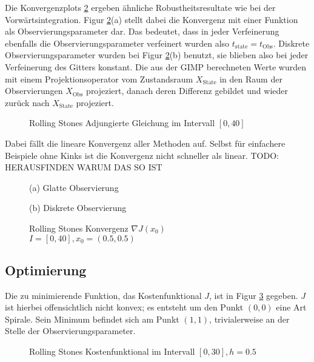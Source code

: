 Die Konvergenzplots \ref{fig:rollingStonesAdjoint} ergeben ähnliche Robustheitsresultate wie bei der Vorwärtsintegration. Figur \ref{fig:rollingStonesAdjoint}(a) stellt dabei die Konvergenz mit einer Funktion als Observierungsparameter dar. Das bedeutet, dass in jeder Verfeinerung ebenfalls die Observierungsparameter verfeinert wurden also $t_{\text{state}} = t_{\text{Obs}}$. Diskrete Observierungsparameter wurden bei Figur \ref{fig:rollingStonesAdjoint}(b) benutzt, sie blieben also bei jeder Verfeinerung des Gitters konstant. Die aus der GIMP berechneten Werte wurden mit einem Projektionsoperator vom Zustandsraum $X_{\text{State}}$ in den Raum der Observierungen $X_{\text{Obs}}$ projeziert, danach deren Differenz gebildet und wieder zurück nach $X_{\text{State}}$ projeziert.
\begin{figure}[H]
\centering

\caption{Rolling Stones Adjungierte Gleichung im Intervall $[0,40]$}
\label{fig:rolling_adjoint_eq}
\end{figure}
Dabei fällt die lineare Konvergenz aller Methoden auf. Selbst für einfachere Beispiele ohne Kinks ist die Konvergenz nicht schneller als linear.
TODO: HERAUSFINDEN WARUM DAS SO IST


\begin{figure}[H]
\footnotesize 
\centering
\begin{minipage}[b]{0.49\linewidth}

\caption*{(a) Glatte Observierung}
\end{minipage}
\begin{minipage}[b]{0.49\linewidth}

\caption*{(b) Diskrete Observierung}
\label{fig:rollingStonesAdjointDiscrete}
\end{minipage}
\caption{Rolling Stones Konvergenz $\nabla J(x_0)$\\ $I=[0,40],x_0=(0.5,0.5)$}
\label{fig:rollingStonesAdjoint}
\end{figure}

\subsection{Optimierung}
Die zu minimierende Funktion, das Kostenfunktional $J$, ist in Figur \ref{fig:rolling_costfunctional} gegeben. $J$ ist hierbei offensichtlich nicht konvex; es entsteht um den Punkt $(0,0)$ eine Art Spirale. Sein Minimum befindet sich am Punkt $(1,1)$, trivialerweise an der Stelle der Observierungsparameter. 
\begin{figure}[H]
\centering

\caption{Rolling Stones Kostenfunktional im Intervall $[0,30],h=0.5$}
\label{fig:rolling_costfunctional}
\end{figure}

